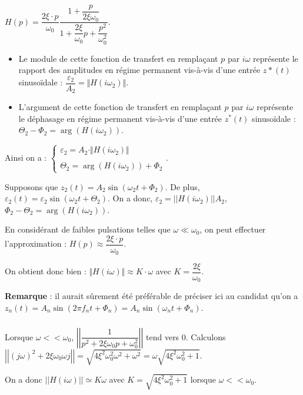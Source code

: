 \documentclass[10pt,fleqn]{article} %
\begin{document}
$
H(p)=\dfrac{2\xi\cdot p}{\omega_0}\dfrac{1+\dfrac{p}{2\xi\omega_0}}{1+\dfrac{2\xi}{\omega_0}p+\dfrac{p^2}{\omega_0^2}}
$.

\begin{itemize}
\item Le module de cette fonction de transfert en remplaçant $p$ par $i\omega$ représente le rapport des amplitudes en régime permanent vis-à-vis d'une entrée $z*(t)$ sinusoïdale : 
$
\dfrac{\varepsilon_2}{A_2}=\Vert H(i\omega_2)\Vert
$.
\item L'argument de cette fonction de transfert en remplaçant $p$ par $i\omega$ représente le déphasage en régime permanent vis-à-vis d'une entrée $z^*(t)$ sinusoïdale : 
$
\Theta_2-\Phi_2=\arg\left(H(i\omega_2)\right)
$.
\end{itemize}

Ainsi on a : 
$
\left\{
\begin{array}{c}
\varepsilon_2=A_2\cdot \Vert H(i\omega_2)\Vert\\
\\
\Theta_2=\arg\left(H(i\omega_2)\right)+\Phi_2
\end{array}
\right.
$.


Supposons que  $z_2(t)=A_2\sin \left(\omega_2 t + \Phi_2 \right)$. De plus, $\varepsilon_2(t)=\varepsilon_2 \sin \left( \omega_2 t + \Theta_2 \right)$. On a donc, $\varepsilon_2 = || H\left( i\omega_2\right)|| A_2$, $\Phi_2 - \Theta_2 = \arg \left(H\left(i\omega_2\right)\right)$.




En considérant de faibles pulsations telles que $\omega\ll \omega_0$, on peut effectuer l'approximation : 
$
H(p)\approx \dfrac{2\xi\cdot p}{\omega_0}
$.

On obtient donc bien : 
$
\Vert H(i\omega)\Vert\approx K\cdot \omega
$ 
avec $K=\dfrac{2\xi}{\omega_0}$.

\textbf{Remarque }: il aurait sûrement été préférable de préciser ici au candidat qu'on a $z_n(t)=A_n\sin \left(2\pi f_n t + \Phi_n \right)=A_n\sin \left(\omega_n t + \Phi_n \right)$. 

\subparagraph{}	
Lorsque $\omega << \omega_0$, $\left|\left|  \dfrac{1}{p^2+2\xi\omega_0 p + \omega_0^2} \right|\right|$ tend vers 0. Calculons $\left|\left|  \left( j \omega \right) ^2+2\xi\omega_0  \omega j  \right|\right| =\sqrt{4\xi^2\omega_0^2 \omega^2 + \omega^2} =\omega \sqrt{4\xi^2\omega_0^2  + 1}$. 

On a donc $|| H\left( i\omega\right)|| \simeq K\omega $ avec $K=\sqrt{4\xi^2\omega_0^2  + 1}$ lorsque $\omega << \omega_0$.
\end{document}
